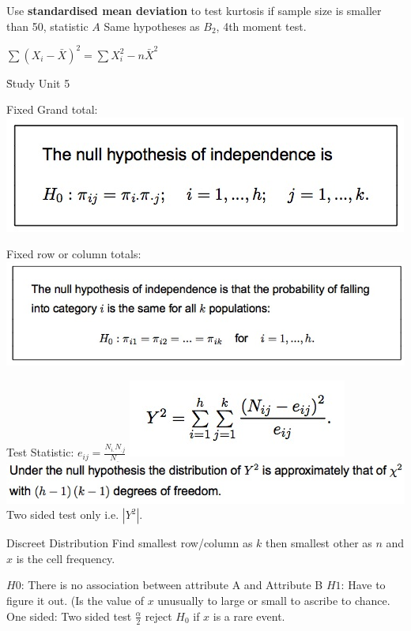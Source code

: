 \documentclass{examnotes}
\begin{document}
Use {\bf standardised mean deviation} to test kurtosis if sample size is smaller than 50, statistic $A$
Same hypotheses as $B_2$, 4th moment test.

\vspace{6pt}
$\sum(X_i-\bar{X})^2=\sum X^2_i-n\bar{X}^2$

\h{Study Unit 5}


Fixed Grand total:
\includegraphics[scale=0.5]{./img/grandtotal.jpg}

Fixed row or column totals:
\includegraphics[scale=0.5]{./img/fixedrow.jpg}

Test Statistic:
$e_{ij}=\displaystyle\frac{N_{i.}N_{.j}}{N_{..}}$
\includegraphics[scale=0.5]{./img/statisitc.jpg}\includegraphics[scale=0.5]{./img/t51.jpg}
Two sided test only i.e. $|Y^2|$.
\vspace{6pt}

Discreet Distribution           
Find smallest row/column as $k$ then smallest other as $n$ and $x$ is the cell frequency.

$H0$: There is no association between attribute A and Attribute B
$H1$: Have to figure it out. (Is the value of $x$ unusually to large or small to ascribe to chance.
One sided:
Two sided test $\frac{\alpha}{2}$ reject $H_0$ if $x$ is a rare event.
\end{document}
